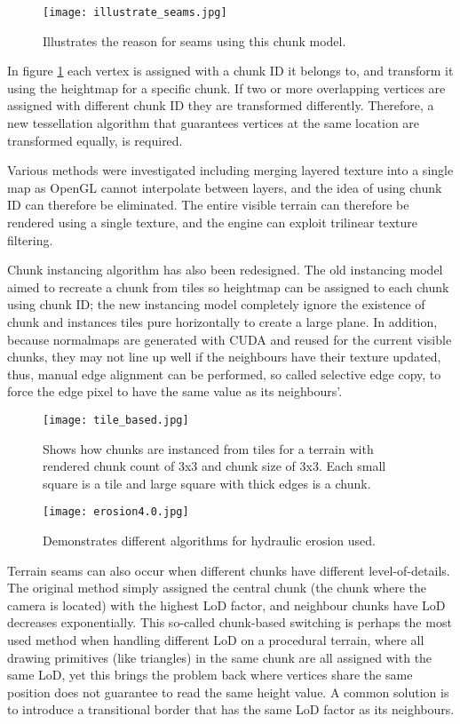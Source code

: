 \documentclass[oneside, a4paper]{article}
\begin{document}
    \begin{figure}[H]
        \texttt{[image: illustrate\_seams.jpg]}
        \caption{Illustrates the reason for seams using this chunk model.}
        \label{seam_reason}
    \end{figure}

    In figure \ref{seam_reason} each vertex is assigned with a chunk ID it belongs to, and transform it using the heightmap for a specific chunk. If two or more overlapping vertices are assigned with different chunk ID they are transformed differently. Therefore, a new tessellation algorithm that guarantees vertices at the same location are transformed equally, is required.

    Various methods were investigated including merging layered texture into a single map as OpenGL cannot interpolate between layers, and the idea of using chunk ID can therefore be eliminated. The entire visible terrain can therefore be rendered using a single texture, and the engine can exploit trilinear texture filtering.
    
    Chunk instancing algorithm has also been redesigned. The old instancing model aimed to recreate a chunk from tiles so heightmap can be assigned to each chunk using chunk ID; the new instancing model completely ignore the existence of chunk and instances tiles pure horizontally to create a large plane. In addition, because normalmaps are generated with CUDA and reused for the current visible chunks, they may not line up well if the neighbours have their texture updated, thus, manual edge alignment can be performed, so called selective edge copy, to force the edge pixel to have the same value as its neighbours'.

    \begin{figure}[H]
        \texttt{[image: tile\_based.jpg]}
        \caption{Shows how chunks are instanced from tiles for a terrain with rendered chunk count of 3x3 and chunk size of 3x3. Each small square is a tile and large square with thick edges is a chunk.}

        \texttt{[image: erosion4.0.jpg]}
        \caption{Demonstrates different algorithms for hydraulic erosion used. }
    \end{figure}

    Terrain seams can also occur when different chunks have different level-of-details. The original method simply assigned the central chunk (the chunk where the camera is located) with the highest LoD factor, and neighbour chunks have LoD decreases exponentially. This so-called chunk-based switching is perhaps the most used method when handling different LoD on a procedural terrain, where all drawing primitives (like triangles) in the same chunk are all assigned with the same LoD, yet this brings the problem back where vertices share the same position does not guarantee to read the same height value. A common solution is to introduce a transitional border that has the same LoD factor as its neighbours.
    
\end{document}
